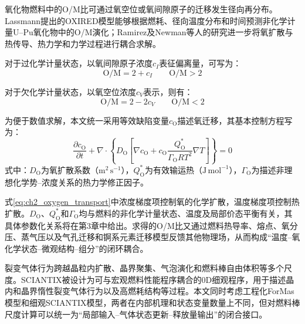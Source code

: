 \label{subsec:ch2_om_transport}

氧化物燃料中的O/M比可通过氧空位或氧间隙原子的迁移发生径向再分布。Lassmann提出的OXIRED模型能够根据燃耗、径向温度分布和时间预测非化学计量U--Pu氧化物中的O/M演化\cite{lassmannOxiredModelRedistribution1987}；Ramirez及Newman等人的研究进一步将氧扩散与热传导、热力学和力学过程进行耦合求解\cite{ramirezSimulationsHeatOxygen2006,newmanThreeDimensionalCoupled2009}。

对于过化学计量状态，以氧间隙原子浓度$c_I$表征偏离量，可写为：
\begin{equation}
	\mathrm{O/M}=2+c_I
	\qquad \mathrm{O/M}>2
	\label{eq:ch2_om_interstitial}
\end{equation}

对于欠化学计量状态，以氧空位浓度$c_V$表示，则有：
\begin{equation}
	\mathrm{O/M}=2-2c_V
	\qquad \mathrm{O/M}<2
	\label{eq:ch2_om_vacancy}
\end{equation}

为便于数值求解，本文统一采用等效缺陷变量$c_{\mathrm O}$描述氧迁移，其基本控制方程写为：
\begin{equation}
	\frac{\partial c_{\mathrm O}}{\partial t}
	+\nabla\cdot
	\left\{
	D_{\mathrm O}
	\left[
	\nabla c_{\mathrm O}
	+c_{\mathrm O}
	\frac{Q_{\mathrm O}^{*}}
	{\Gamma_{\mathrm O}RT^2}
	\nabla T
	\right]
	\right\}
	=0
	\label{eq:ch2_oxygen_transport}
\end{equation}
\noindent 式中：$D_{\mathrm O}$为氧扩散系数（$\mathrm{m^2\,s^{-1}}$），$Q_{\mathrm O}^{*}$为有效输运热（$\mathrm{J\,mol^{-1}}$），$\Gamma_{\mathrm O}$为描述非理想化学势--浓度关系的热力学修正因子。

式\eqref{eq:ch2_oxygen_transport}中浓度梯度项控制氧的化学扩散，温度梯度项控制热扩散。$D_{\mathrm O}$、$Q_{\mathrm O}^{*}$和$\Gamma_{\mathrm O}$均与燃料的非化学计量状态、温度及局部价态平衡有关，其具体参数化关系将在第3章中给出。求得的O/M比又通过燃料热导率、熔点、氧分压、蒸气压以及气孔迁移和锕系元素迁移模型反馈其他物理场，从而构成“温度--氧化学状态--微观结构--组分”的闭环耦合。

\label{sec:ch2_fission_gas_plenum}

裂变气体行为跨越晶粒内扩散、晶界聚集、气泡演化和燃料棒自由体积等多个尺度。SCIANTIX被设计为可与宏观燃料性能程序耦合的0D细观程序，用于描述晶内和晶界惰性裂变气体行为以及高燃耗结构等过程\cite{pizzocriSCIANTIXNewOpen2020}。本文同时考虑工程化ForMas模型和细观SCIANTIX模型，两者在内部机理和状态变量数量上不同，但对燃料棒尺度计算可以统一为“局部输入--气体状态更新--释放量输出”的闭合接口。

